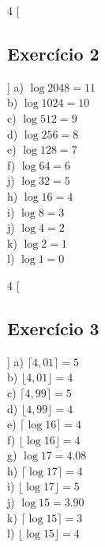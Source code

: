 \documentclass[12pt]{article}
\begin{document}
\begin{multicols}{4}
  [
    \subsection{Exercício 2}
  ]
  a) $\log{2048} = 11$ \\
  b) $\log{1024} = 10$ \\
  c) $\log{512} = 9$ \\
  d) $\log{256} = 8$ \\
  e) $\log{128} = 7$ \\
  f) $\log{64} = 6$ \\
  j) $\log{32} = 5$ \\
  h) $\log{16} = 4$ \\
  i) $\log{8} = 3$ \\
  j) $\log{4} = 2$ \\
  k) $\log{2} = 1$ \\
  l) $\log{1} = 0$ \\
\end{multicols}

\begin{multicols}{4}
  [
    \subsection{Exercício 3}
  ]
  a) $\lceil 4,01 \rceil = 5$ \\
  b) $\lfloor 4,01 \rfloor = 4$ \\
  c) $\lceil 4,99 \rceil = 5$ \\
  d) $\lfloor 4,99 \rfloor = 4$ \\
  e) $\lceil \log{16} \rceil = 4$ \\
  f) $\lfloor \log{16} \rfloor = 4$ \\
  g) $\log{17} = 4.08$ \\
  h) $\lceil \log{17} \rceil = 4$ \\
  i) $\lfloor \log{17} \rfloor = 5$ \\
  j) $\log{15} = 3.90$ \\
  k) $\lceil \log{15} \rceil = 3$ \\
  l) $\lfloor \log{15} \rfloor = 4$ \\
  
\end{multicols}
  
\end{document}
